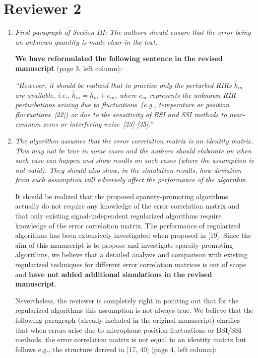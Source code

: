 \documentclass[9pt, a4paper]{article}
\begin{document}
\section{Reviewer 2}

\begin{enumerate}
\item {\textit{First paragraph of Section III: The authors should ensure that the error being an unknown quantity is made clear in the text.}}

\textbf{We have reformulated the following sentence in the revised manuscript} (page 3, left column):

\emph{``However, it should be realized that in practice only the perturbed RIRs $\hat{h}_m$ are available, i.e., $\hat{h}_m = h_m + e_m$, where $e_m$ represents the unknown RIR perturbations arising due to fluctuations~(e.g., temperature or position fluctuations~[22]) or due to the sensitivity of BSI and SSI methods to near-common zeros or interfering noise~[23]-[25].''
}

\item {\textit{The algorithm assumes that the error correlation matrix is an identity matrix. This may not be true in some cases and the authors should elaborate on when such case can happen and show results on such cases (where the assumption is not valid). They should also show, in the simulation results, how deviation from such assumption will adversely affect the performance of the algorithm.}}

  It should be realized that the proposed sparsity-promoting algorithms actually do not require any knowledge of the error correlation matrix and that only existing signal-independent regularized algorithms require knowledge of the error correlation matrix.
  The performance of regularized algorithms has been extensively investigated when proposed in [19].
  Since the aim of this manuscript is to propose and investigate sparsity-promoting algorithms, we believe that a detailed analysis and comparison with existing regularized techniques for different error correlation matrices is out of scope and {\textbf{have not added additional simulations in the revised manuscript}}.

Nevertheless, the reviewer is completely right in pointing out that for the regularized algorithms this assumption is not always true.
We believe that the following paragraph (already included in the original manuscript) clarifies that when errors arise due to microphone position fluctuations or BSI/SSI methods, the error correlation matrix is not equal to an identity matrix but follows e.g., the structure derived in [17, 40] (page 4, left column):


\end{enumerate}
\end{document}

